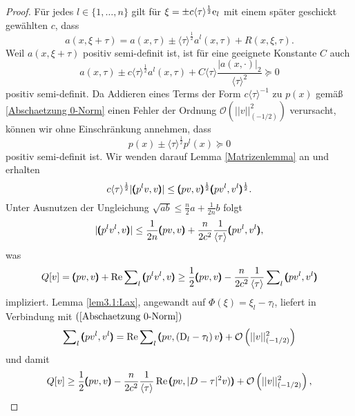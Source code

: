 \begin{proof}
Für jedes $l\in\{1,\dots, n\}$ gilt für $\xi = \pm c\langle\tau\rangle^{\frac{1}{2}}\mathrm e_l$ mit einem später geschickt gewählten $c$, dass
\begin{equation}
	a(x,\xi+\tau) = a(x,\tau)\pm\langle\tau\rangle^{\frac{1}{2}}a^l(x,\tau) + R(x,\xi,\tau). 
\end{equation}
Weil $a(x,\xi+\tau)$ positiv semi-definit ist, ist für eine geeignete Konstante $C$ auch
\begin{equation}
	a(x,\tau) \pm c\langle\tau\rangle^{\frac{1}{2}}a^l(x,\tau)+C\langle\tau\rangle \frac{| a(x,\cdot)|_{2}}{\langle\tau\rangle^2}\succeq 0
\end{equation}
positiv semi-definit. Da Addieren eines Terms der Form $c \langle\tau\rangle^{-1}$ zu $p(x)$ gemäß \eqref{Abschaetzung 0-Norm} einen Fehler der Ordnung $\mathcal O\left(\vert\vert v\vert\vert_{\left(-{1}/{2}\right)}^2\right)$ verursacht, können wir ohne Einschränkung annehmen, dass  
\begin{equation}
	p(x) \pm \langle\tau\rangle^{\frac{1}{2}}p^l(x) \succeq 0
\end{equation}
positiv semi-definit ist. Wir wenden darauf Lemma \ref{Matrizenlemma} an und erhalten
\begin{equation}
	c\langle\tau\rangle^{\frac{1}{2}} |\pmb(p^lv,v\pmb)|\le\pmb(pv,v\pmb)^{\frac{1}{2}}\pmb(pv^l,v^l\pmb)^{\frac{1}{2}}.
\end{equation}
Unter Ausnutzen der Ungleichung $\sqrt{ab}\le \frac{n}{2}a+\frac{1}{2n}b$ folgt
\begin{equation}
	|\pmb(p^lv^l,v\pmb)|\le \frac{1}{2n}\pmb(pv,v\pmb)+\frac{n}{2c^2}\frac{1}{\langle\tau\rangle}\pmb(pv^l,v^l\pmb),
\end{equation}
was
\begin{equation}
	Q[ v]=\pmb(pv,v\pmb)+\operatorname{Re}\sum\nolimits_l \pmb(p^lv^l,v\pmb) \ge \frac{1}{2}\pmb(pv,v\pmb) -\frac{n}{2c^2}\frac{1}{\langle\tau\rangle}\sum\nolimits_l \pmb(pv^l,v^l\pmb)
\end{equation}
impliziert. Lemma \ref{lem3.1:Lax}, angewandt auf $\Phi(\xi) = \xi_l-\tau_l$, liefert in Verbindung mit $(\ref{Abschaetzung 0-Norm})$
\begin{equation}
\sum\nolimits_l \pmb(pv^l,v^l\pmb)=\operatorname{Re}\sum\nolimits_l \pmb(pv,\left(\mathrm D_l-\tau_l\right)v\pmb)+\mathcal{O}\left(|| v||_{\left(-{1}/{2}\right)}^2\right) 
\end{equation}
und damit
\begin{equation}
	Q[v] \ge \frac{1}{2}\spro{pv}{v}-\frac{n}{2c^2}\frac{1}{\langle\tau\rangle}\Re\spro{pv}{| D-\tau|^2v)}+\mathcal{O}\left(|| v||_{\left(-{1}/{2}\right)}^2\right),

\end{equation}
\end{proof}
